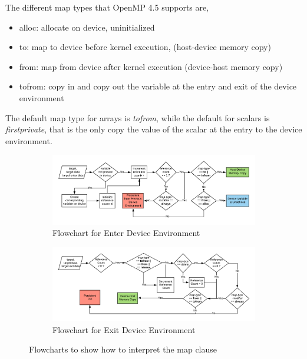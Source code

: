 The different map types that OpenMP 4.5 supports are, 
\begin{itemize}
\vspace{-5pt}
    \item alloc: allocate on device, uninitialized
 \item to: map to device before kernel execution, (host-device memory copy)
 \item from:  map from device after kernel execution (device-host memory copy)
 \item   tofrom: copy in and copy out the variable at the entry and exit of the device environment  
\end{itemize}
\vspace{-9pt}
The default map type for arrays is \textit{tofrom}, 
while the default for scalars
is \textit{firstprivate}, that is the only copy the value of the 
scalar at the entry to the device environment.
\begin{figure}[h!]
\vspace{-20pt}
\begin{subfigure}[b]{1\textwidth}
\centering
    \includegraphics[scale=0.6]{images/data-enter.png}
  \caption{Flowchart for Enter Device Environment}
    \label{host-device-flowchart}    
  \end{subfigure} 
  
  \begin{subfigure}[b]{1\textwidth}
  \centering
    \includegraphics[scale=0.6]{images/data-exit.png}
    \caption{Flowchart for Exit Device Environment}
    \label{device-host-flowchart}    
  \end{subfigure}
  \caption{Flowcharts to show how to interpret the map clause}    
  \label{mapSemantics}
\vspace{-20pt}
\end{figure} 
